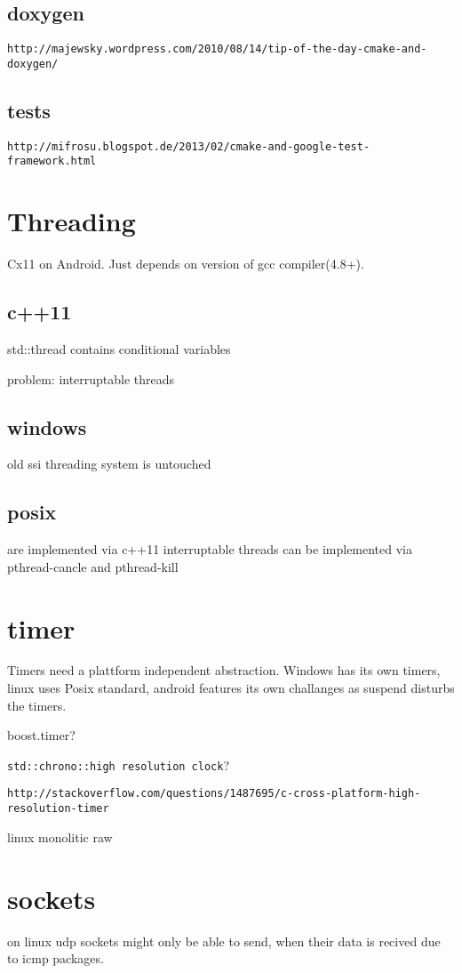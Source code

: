 \documentclass[
10pt, %
a4paper, %
oneside, %
headinclude,footinclude, %
BCOR5mm, %
]{scrartcl}
\begin{document}
\subsection{doxygen}
\verb|http://majewsky.wordpress.com/2010/08/14/tip-of-the-day-cmake-and-doxygen/|
\subsection{tests}

\verb|http://mifrosu.blogspot.de/2013/02/cmake-and-google-test-framework.html|


\section{Threading}
Cx11 on Android.
Just depends on version of gcc compiler(4.8+).

\subsection{c++11}
std::thread
contains conditional variables

problem: interruptable threads

\subsection{windows}
old ssi threading system is untouched

\subsection{posix}
are implemented via c++11
interruptable threads can be implemented via pthread-cancle and pthread-kill


\section{timer}
Timers need a plattform independent abstraction.
Windows has its own timers, linux uses Posix standard, android features its own challanges as suspend disturbs the timers.

boost.timer?

\verb|std::chrono::high resolution clock|?

\verb|http://stackoverflow.com/questions/1487695/c-cross-platform-high-resolution-timer|

linux monolitic raw

\section{sockets}
on linux udp sockets might only be able to send, when their data is recived due to icmp packages.
\end{document}
